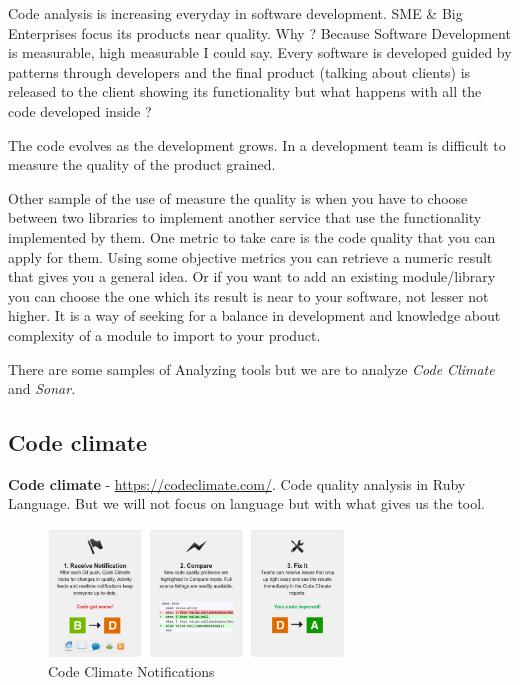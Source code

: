 \documentclass[11pt]{scrartcl}
\begin{document}
\par Code analysis is increasing everyday in software development. SME \& Big Enterprises focus its products near quality. Why ? Because Software Development is measurable, high measurable I could say. Every software is developed guided by patterns through developers and the final product (talking about clients) is released to the client showing its functionality but what happens with all the code developed inside ?

\par The code evolves as the development grows. In a development team is difficult to measure the quality of the product grained.

\par Other sample of the use of measure the quality is when you have to choose between two libraries to implement another service that use the functionality implemented by them. One metric to take care is the code quality that you can apply for them. Using some objective metrics you can retrieve a numeric result that gives you a general idea. Or if you want to add an existing module/library you can choose the one which its result is near to your software, not lesser not higher. It is a way of seeking for a balance in development and knowledge about complexity of a module to import to your product.

\par There are some samples of Analyzing tools but we are to analyze \emph{Code Climate} and \emph{Sonar}.

\subsection{Code climate}
\label{sub:code-climate}

\textbf{Code climate} - \url{https://codeclimate.com/}. Code quality analysis in Ruby Language. But we will not focus on language but with what gives us the tool.

\begin{figure}[H]
\centering
\includegraphics[width=0.7\textwidth]{code-climate.png}
\caption{Code Climate Notifications}
\label{}
\end{figure}
\end{document}
